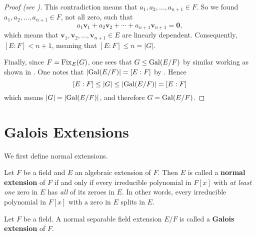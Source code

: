\begin{proof}[Proof (see {\cite[Theorem 14]{artin_1971}})]
    This contradiction means that $a_1, a_2, \dots, a_{n+1} \in F$. So we found $a_1, a_2, \dots, a_{n+1} \in F$, not all zero, such that
    \[
        a_1\textbf{v}_1 + a_2\textbf{v}_2 + \cdots + a_{n+1}\textbf{v}_{n+1} = \textbf{0},
    \]
    which means that $\textbf{v}_1, \textbf{v}_2, \dots, \textbf{v}_{n+1} \in E$ are linearly dependent. Consequently, $[E:F] < n + 1$, meaning that $[E:F] \leq n = |G|$.

    Finally, since $F = \mathrm{Fix}_{E}(G)$, one sees that $G \leq \mathrm{Gal}(E/F)$ by similar working as shown in . One notes that $|\mathrm{Gal}(E/F)| = [E:F]$ by . Hence
    \[
        [E:F] \leq |G| \leq |\mathrm{Gal}(E/F)| = [E:F]
    \]
    which means $|G| = |\mathrm{Gal}(E/F)|$, and therefore $G = \mathrm{Gal}(E/F)$.
\end{proof}

\section{Galois Extensions}
We first define normal extensions.

\begin{definition}
    Let $F$ be a field and $E$ an algebraic extension of $F$. Then $E$ is called a \textbf{normal extension} of $F$ if and only if every irreducible polynomial in $F[x]$ with \textit{at least one} zero in $E$ has \textit{all} of its zeroes in $E$. In other words, every irreducible polynomial in $F[x]$ with a zero in $E$ splits in $E$.
\end{definition}

\begin{definition}
    Let $F$ be a field. A normal separable field extension $E/F$ is called a \textbf{Galois extension} of $F$.
\end{definition}

